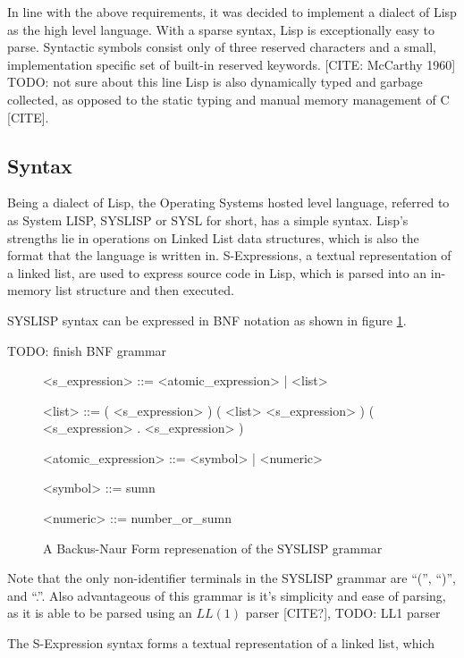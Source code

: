 \documentclass[11pt]{report}
\begin{document}
In line with the above requirements, it was decided to implement a dialect of Lisp as the high level language. With a sparse syntax, Lisp is exceptionally easy to parse. Syntactic symbols consist only of three reserved characters and a small, implementation specific set of built-in reserved keywords. [CITE: McCarthy 1960]
TODO: not sure about this line
Lisp is also dynamically typed and garbage collected, as opposed to the static typing and manual memory management of C [CITE].

\subsection{Syntax}
Being a dialect of Lisp, the Operating Systems hosted level language, referred to as System LISP, SYSLISP or SYSL for short, has a simple syntax. Lisp's strengths lie in operations on Linked List data structures, which is also the format that the language is written in. S-Expressions, a textual representation of a linked list, are used to express source code in Lisp, which is parsed into an in-memory list structure and then executed.

SYSLISP syntax can be expressed in BNF notation as shown in figure \ref{fig:bnf}.

TODO: finish BNF grammar
\begin{figure}[h!]
  \centering
  \begin{grammar}
    <s_expression> ::= <atomic_expression> | <list>
    
    <list> ::= ( <s_expression> )
    \alt ( <list> <s_expression> )
    \alt ( <s_expression> . <s_expression> )
    
    <atomic_expression> ::= <symbol> | <numeric>
    
    <symbol> ::= sumn
    
    <numeric> ::= number_or_sumn
  \end{grammar}
  \caption{A Backus-Naur Form represenation of the SYSLISP grammar}
  \label{fig:bnf}
\end{figure}

Note that the only non-identifier terminals in the SYSLISP grammar are ``('', ``)'', and ``.''. Also advantageous of this grammar is it's simplicity and ease of parsing, as it is able to be parsed using an $LL(1)$ parser [CITE?], TODO: LL1 parser

\newpage

The S-Expression syntax forms a textual representation of a linked list, which 
\end{document}
